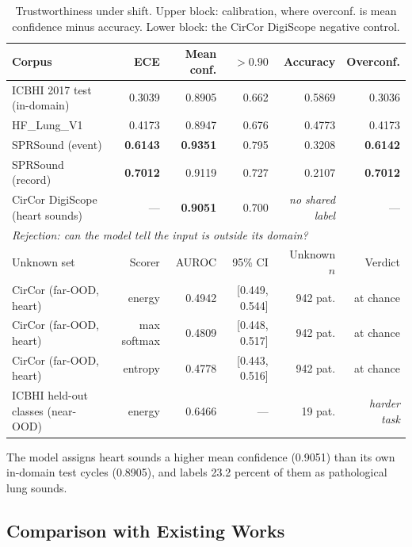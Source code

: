 \documentclass[journal,onecolumn]{IEEEtran}
\newcommand{\best}[1]{\textbf{#1}}
\newif\ifshownew
\newcommand{\added}[1]{\ifshownew\ul{#1}\else#1\fi}
\begin{document}
\begin{table}[hbtp]
\centering
\caption{\added{Trustworthiness under shift. Upper block: calibration, where
overconf. is mean confidence minus accuracy. Lower block: the CirCor DigiScope negative
control.}}
\label{tab:trust}
\footnotesize
\begin{tabular}{lrrrrr}
\toprule
Corpus & ECE & Mean conf. & $>0.90$ & Accuracy & Overconf. \\
\midrule
ICBHI 2017 test (in-domain) & 0.3039 & 0.8905 & 0.662 & 0.5869 & 0.3036 \\
HF\_Lung\_V1 & 0.4173 & 0.8947 & 0.676 & 0.4773 & 0.4173 \\
SPRSound (event) & \best{0.6143} & \best{0.9351} & 0.795 & 0.3208 & \best{0.6142} \\
SPRSound (record) & \best{0.7012} & 0.9119 & 0.727 & 0.2107 & \best{0.7012} \\
CirCor DigiScope (heart sounds) & --- & \best{0.9051} & 0.700 & \emph{no shared label} & --- \\
\midrule
\multicolumn{6}{l}{\emph{Rejection: can the model tell the input is outside its domain?}}\\
\midrule
Unknown set & Scorer & AUROC & 95\% CI & Unknown $n$ & Verdict \\
\midrule
CirCor (far-OOD, heart) & energy & 0.4942 & [0.449, 0.544] & 942 pat. & at chance \\
CirCor (far-OOD, heart) & max softmax & 0.4809 & [0.448, 0.517] & 942 pat. & at chance \\
CirCor (far-OOD, heart) & entropy & 0.4778 & [0.443, 0.516] & 942 pat. & at chance \\
ICBHI held-out classes (near-OOD) & energy & 0.6466 & --- & 19 pat. & \emph{harder task} \\
\bottomrule
\end{tabular}

\vspace{2pt}
\footnotesize The model assigns heart sounds a higher mean confidence (0.9051) than its own
in-domain test cycles (0.8905), and labels 23.2 percent of them as pathological lung sounds.
\end{table}


\subsection{Comparison with Existing Works}
\label{subsec:comparison}
\end{document}
